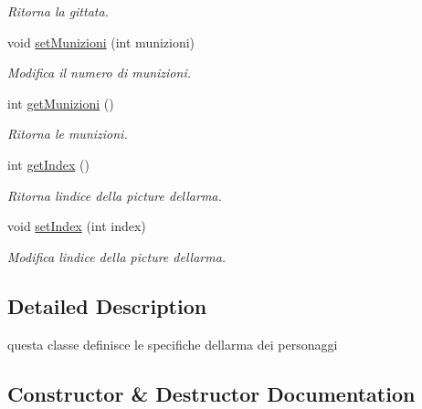\begin{DoxyCompactItemize}
\begin{DoxyCompactList}\small\item\em Ritorna la gittata. \end{DoxyCompactList}\item 
void \hyperlink{classArma_abfdb5fc20a25ed0bce424800abe303f9}{set\+Munizioni} (int munizioni)
\begin{DoxyCompactList}\small\item\em Modifica il numero di munizioni. \end{DoxyCompactList}\item 
\hypertarget{classArma_ab6b10ed7263f417714031c8c8fee15b1}{}int \hyperlink{classArma_ab6b10ed7263f417714031c8c8fee15b1}{get\+Munizioni} ()\label{classArma_ab6b10ed7263f417714031c8c8fee15b1}

\begin{DoxyCompactList}\small\item\em Ritorna le munizioni. \end{DoxyCompactList}\item 
\hypertarget{classArma_a544f304162ba5a008bfd7f93b5c99bf3}{}int \hyperlink{classArma_a544f304162ba5a008bfd7f93b5c99bf3}{get\+Index} ()\label{classArma_a544f304162ba5a008bfd7f93b5c99bf3}

\begin{DoxyCompactList}\small\item\em Ritorna l\textquotesingle{}indice della picture dell\textquotesingle{}arma. \end{DoxyCompactList}\item 
void \hyperlink{classArma_af92b4737cebe4dcbd7d116786d3dc813}{set\+Index} (int index)
\begin{DoxyCompactList}\small\item\em Modifica l\textquotesingle{}indice della picture dell\textquotesingle{}arma. \end{DoxyCompactList}\end{DoxyCompactItemize}


\subsection{Detailed Description}
questa classe definisce le specifiche dell\textquotesingle{}arma dei personaggi 

\subsection{Constructor \& Destructor Documentation}
\hypertarget{classArma_ae76c11390a927581c503fc87af398050}{}
